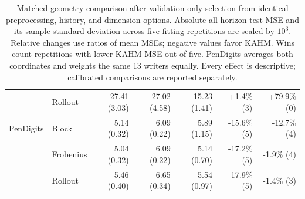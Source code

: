 \begin{table}[t]
\begin{tabular}{llrrrrr}
 & Rollout & 27.41 (3.03) & 27.02 (4.58) & 15.23 (1.41) & +1.4\% (3) & +79.9\% (0)\\
\addlinespace[3pt]
PenDigits & Block & 5.14 (0.32) & 6.09 (0.22) & 5.89 (1.15) & -15.6\% (5) & -12.7\% (4)\\
 & Frobenius & 5.04 (0.32) & 6.09 (0.22) & 5.14 (0.70) & -17.2\% (5) & -1.9\% (4)\\
 & Rollout & 5.46 (0.40) & 6.65 (0.34) & 5.54 (0.97) & -17.9\% (5) & -1.4\% (3)\\
\bottomrule
\end{tabular}
\caption{Matched geometry comparison after validation-only selection from identical preprocessing, history, and dimension options. Absolute all-horizon test MSE and its sample standard deviation across five fitting repetitions are scaled by $10^3$. Relative changes use ratios of mean MSEs; negative values favor KAHM. Wins count repetitions with lower KAHM MSE out of five. PenDigits averages both coordinates and weights the same 13 writers equally. Every effect is descriptive; calibrated comparisons are reported separately.}
\label{tab:matched-geometry-primary}
\label{tab:matched-geometry-mse}
\end{table}
